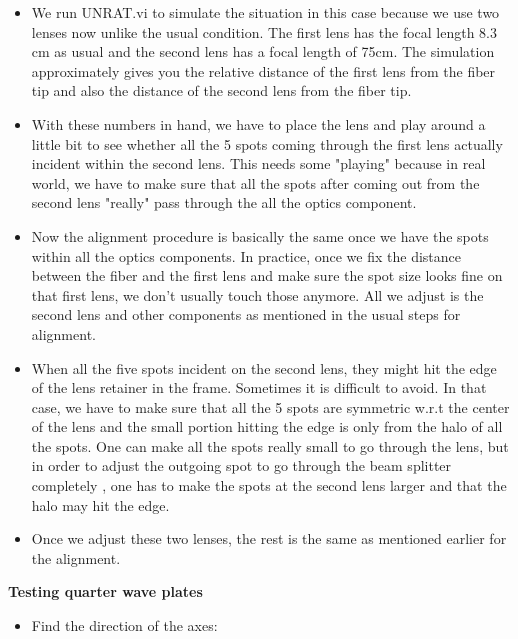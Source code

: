 {\begin{itemize}
\item We run UNRAT.vi to simulate the situation in this case because we use
two lenses now unlike the usual condition. The first lens has the focal
length 8.3 cm as usual and the second lens has a focal length of 75cm. The
simulation approximately gives you the relative distance of the first lens
from the fiber tip and also the distance of the second lens from the fiber
tip.

\item With these numbers in hand, we have to place the lens and play around a
little bit to see whether all the 5 spots coming through the first lens
actually incident within the second lens. This needs some "playing"
because in real world, we have to make sure that all the spots after
coming out from  the second lens "really" pass through the all the optics
component.

\item Now the alignment procedure is basically the same once we have the
spots within all the optics components. In practice, once we fix the
distance between the fiber and the first lens and make sure the spot size
looks fine on that first lens, we don't usually touch those anymore. All we
adjust is the second lens and other components as mentioned in the usual
steps for alignment.

\item When all the five spots incident on the second lens, they might
hit the edge of the lens retainer in the frame. Sometimes it is difficult 
to avoid. In that case, we have to make sure that all the 5 spots are
symmetric w.r.t the center of the lens and the small portion hitting the
edge is only from the halo of all the spots. One
can make all the spots really small to go through the lens, but in order
to adjust the outgoing spot to go through the beam splitter completely ,
one has to make the spots at the second lens larger and that
the halo may hit the edge.

\item Once we adjust these two lenses, the rest is the same as mentioned
earlier for the alignment.

\end{itemize}

\medskip
\noindent
{\bf{Testing quarter wave plates}}

\begin{itemize}
\item Find the direction of the axes:


\end{itemize}}

